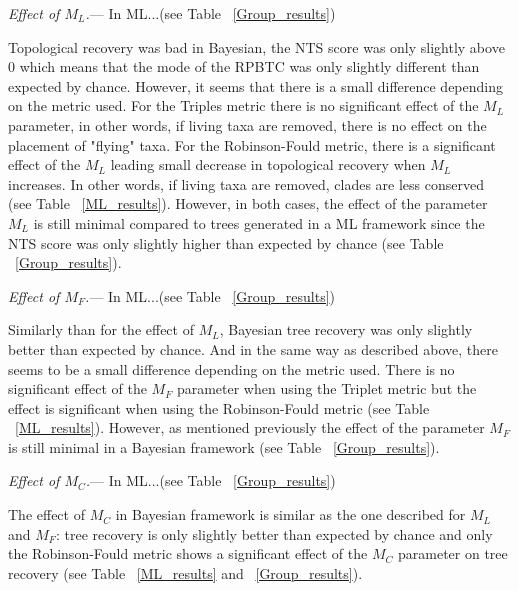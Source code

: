 \documentclass[12pt,letterpaper]{article}
\renewcommand{\subsubsection}[1]{%
\vspace{2ex}
\noindent
\textit{#1.}---}
\begin{document}
\subsubsection{Effect of $M_L$}
In ML...(see Table ~\ref{Group_results})

Topological recovery was bad in Bayesian, the NTS score was only slightly above 0 which means that the mode of the RPBTC was only slightly different than expected by chance.
However, it seems that there is a small difference depending on the metric used.
For the Triples metric there is no significant effect of the $M_L$ parameter, in other words, if living taxa are removed, there is no effect on the placement of "flying" taxa.
For the Robinson-Fould metric, there is a significant effect of the $M_L$ leading small decrease in topological recovery when $M_L$ increases.
In other words, if living taxa are removed, clades are less conserved (see Table ~\ref{ML_results}).
However, in both cases, the effect of the parameter $M_L$ is still minimal compared to trees generated in a ML framework since the NTS score was only slightly higher than expected by chance (see Table ~\ref{Group_results}).

\subsubsection{Effect of $M_F$}
In ML...(see Table ~\ref{Group_results})

Similarly than for the effect of $M_L$, Bayesian tree recovery was only slightly better than expected by chance.
And in the same way as described above, there seems to be a small difference depending on the metric used.
There is no significant effect of the $M_F$ parameter when using the Triplet metric but the effect is significant when using the Robinson-Fould metric (see Table ~\ref{ML_results}).
However, as mentioned previously the effect of the parameter $M_F$ is still minimal in a Bayesian framework (see Table ~\ref{Group_results}).

\subsubsection{Effect of $M_C$}
In ML...(see Table ~\ref{Group_results})

The effect of $M_C$ in Bayesian framework is similar as the one described for $M_L$ and $M_F$: tree recovery is only slightly better than expected by chance and only the Robinson-Fould metric shows a significant effect of the $M_C$ parameter on tree recovery (see Table ~\ref{ML_results} and ~\ref{Group_results}).
\end{document}
